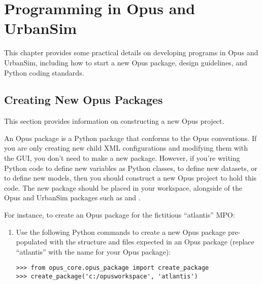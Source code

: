 
\chapter{Programming in Opus and UrbanSim}
\label{chapter:programming}

This chapter provides some practical details on developing programs in Opus
and UrbanSim, including how to start a new Opus package, design guidelines,
and Python coding standards.

\section{Creating New Opus Packages}
\label{sec:create-opus-package}

This section provides information on constructing a new Opus project.

An Opus package is a Python package that conforms to the
Opus conventions.  If you are only creating new child XML configurations and
modifying them with the GUI, you don't need to make a new package.  However, if
you're writing Python code to define new variables as Python classes, to define new 
datasets, or to define new models, then you should construct a new Opus project 
to hold this code.  The new package should be 
placed in your workspace, alongside of the Opus and UrbanSim packages such as 
 and .

For instance, to create an
Opus package for the fictitious ``atlantis'' MPO:

\begin{enumerate}
  \item Use the following Python commands to create a new  Opus
  package pre-populated with the structure and files expected in an Opus package
  (replace ``atlantis'' with the name for your Opus package):
\begin{verbatim}
>>> from opus_core.opus_package import create_package
>>> create_package('c:/opusworkspace', 'atlantis')
\end{verbatim}
\end{enumerate}

